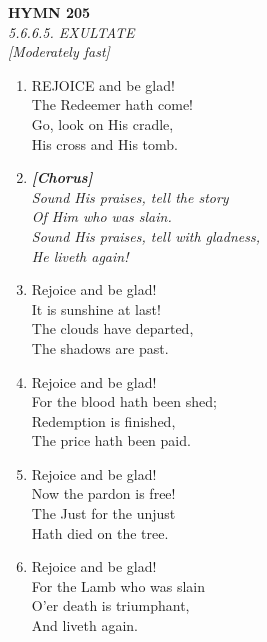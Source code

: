 \newpage
\begin{center}
    {\Large \textbf{HYMN 205}}
    \\
    \textit{5.6.6.5. EXULTATE}
    \\
    \textit{\small [Moderately fast]}
\end{center}
\vspace{1em}

\begin{enumerate}
    \item REJOICE and be glad! \\
        The Redeemer hath come! \\
        Go, look on His cradle, \\
        His cross and His tomb.

    \item[] \vspace{0.4em}
    \textbf{\textit{[Chorus]}} \\
    \textit{Sound His praises, tell the story} \\
    \textit{    Of Him who was slain.} \\
    \textit{Sound His praises, tell with gladness,} \\
    \textit{    He liveth again!}
    \vspace{0.4em}

    \item Rejoice and be glad! \\
        It is sunshine at last! \\
        The clouds have departed, \\
        The shadows are past.

    \item Rejoice and be glad! \\
        For the blood hath been shed; \\
        Redemption is finished, \\
        The price hath been paid.

    \item Rejoice and be glad! \\
        Now the pardon is free! \\
        The Just for the unjust \\
        Hath died on the tree.

    \item Rejoice and be glad! \\
        For the Lamb who was slain \\
        O'er death is triumphant, \\
        And liveth again.


\end{enumerate}
